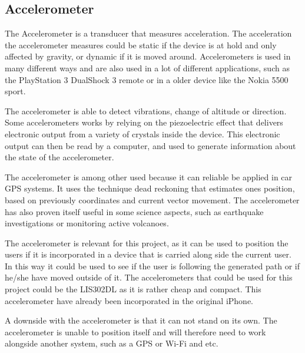 \subsection{Accelerometer}\label{subs_acel}

The Accelerometer is a transducer that measures acceleration. The acceleration the accelerometer measures could be static if the device is at hold and only affected by gravity, or dynamic if it is moved around\cite{acc_engi}. Accelerometers is used in many different ways and are also used in a lot of different applications, such as the PlayStation 3 DualShock 3 remote\cite{acc_ps3} or in a older device like the Nokia 5500 sport\cite{acc_nokia}.


The accelerometer is able to detect vibrations, change of altitude or direction\cite{acc_engi}. Some accelerometers works by relying on the piezoelectric effect that delivers electronic output from a variety of crystals inside the device\cite{acc_piezo}. This electronic output can then be read by a computer, and used to generate information about the state of the accelerometer.


The accelerometer is among other used because it can reliable be applied in car GPS systems. It uses the technique dead reckoning that estimates ones position, based on previously coordinates and current vector movement\cite{acc_dead}. The accelerometer has also proven itself useful in some science aspects, such as earthquake investigations or monitoring active volcanoes\cite{acc_vulkan}. 


The accelerometer is relevant for this project, as it can be used to position the users if it is incorporated in a device that is carried along side the current user. In this way it could be used to see if the user is following the generated path or if he/she have moved outside of it. The accelerometers that could be used for this project could be the LIS302DL as it is rather cheap and compact\cite{acc_price,acc_lis302dl}. This accelerometer have already been incorporated in the original iPhone\cite{acc_iPhone}.


A downside with the accelerometer is that it can not stand on its own. The accelerometer is unable to position itself and will therefore need to work alongside another system, such as a GPS or Wi-Fi and etc. 